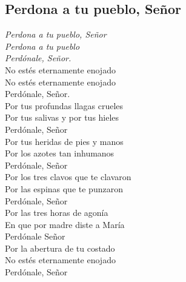 \subsection{Perdona a tu pueblo, Señor}

\begin{center}

{\Large
\textit{Perdona a tu pueblo, Señor} \\
\textit{Perdona a tu pueblo}\\
\textit{Perdónale, Señor.}\\
 \vspace{0.7cm}
No estés eternamente enojado\\
No estés eternamente enojado\\
Perdónale, Señor.\\
  \vspace{0.7cm}
Por tus profundas llagas crueles\\
Por tus salivas y por tus hieles\\
Perdónale, Señor\\
  \vspace{0.7cm}
Por tus heridas de pies y manos\\
Por los azotes tan inhumanos\\
Perdónale, Señor\\
  \vspace{0.7cm}
Por los tres clavos que te clavaron\\
Por las espinas que te punzaron\\
Perdónale, Señor\\
  \vspace{0.7cm}
Por las tres horas de agonía\\
En que por madre diste a María\\
Perdónale Señor\\
  \vspace{0.7cm}
Por la abertura de tu costado\\
No estés eternamente enojado\\
Perdónale, Señor\\
}
\end{center}